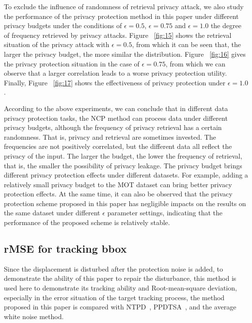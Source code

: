 \documentclass[trans]{IEEEtran}
\newcommand{\el}[1]{{\color{black}#1}}
\begin{document}
To exclude the influence of randomness of retrieval privacy attack, we also study the performance of the privacy protection method in this paper under different privacy budgets under the conditions of $\epsilon=0.5$, $\epsilon=0.75$ and $\epsilon=1.0$ \el{ the} degree of frequency retrieved by privacy attacks. Figure ~\ref{fig:15} \el{ shows the retrieval situation of the privacy attack 
 with $\epsilon=0.5$, from which it can be seen that, the larger the privacy budget, the more similar the distribution. Figure ~\ref{fig:16} gives the privacy protection situation in the case of $\epsilon=0.75$, from which} we can observe that a larger correlation leads to a worse privacy protection utility.  Finally, Figure ~\ref{fig:17} shows the effectiveness of privacy protection under $\epsilon=1.0$. 

According to the above experiments, we can conclude that in different data privacy protection tasks, the NCP method can process data under different privacy budgets, although the frequency of privacy retrieval has a certain randomness. That is, privacy and retrieval are sometimes invested. The frequencies are not positively correlated, but the different data all reflect the privacy of the input. \el{ The larger the budget,} the lower the frequency of retrieval, that is, the smaller the possibility of privacy leakage. The privacy budget brings different privacy protection effects under different datasets. For example, adding a relatively small privacy budget to the MOT dataset can bring better privacy protection effects. At the same time, it can also be observed that the privacy protection scheme proposed in this paper \el{ has negligible impacts on } the results on the same dataset under different $\epsilon$ parameter settings, indicating that the performance of the proposed scheme is relatively stable.

\subsection{rMSE for tracking bbox}
Since the displacement is disturbed after the protection noise is added, to demonstrate the ability of this paper to repair the disturbance, this method is used here to demonstrate its tracking ability and Root-mean-square deviation, especially in the error situation of the target tracking process, the method proposed in this paper  \el{ is compared with} NTPD~\cite{zhao2020novel}, PPDTSA~\cite{ma2021ppdtsa}, and the average white noise method. 
\end{document}
